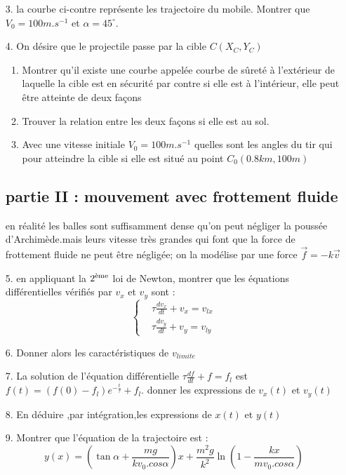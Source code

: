 \documentclass[12pt,a4paper]{article}
\begin{document}
\begin{enumerate}
 \item[3.] la courbe ci-contre représente les trajectoire du mobile. Montrer que $ V_0=100m.s^{-1}$ et  $\alpha = 45^\circ$. 
 \item[4.] On désire que le projectile passe par la cible $C(X_C,Y_C)$
 \begin{enumerate}
 \item Montrer qu'il existe une courbe appelée courbe de sûreté à l'extérieur de laquelle la cible est en sécurité par contre si elle est à l'intérieur, elle peut être atteinte de deux façons 
 \item Trouver la relation entre les deux façons si elle est au sol.
\item Avec une vitesse initiale $V_0=100m.s^{-1}$ quelles sont les angles du tir qui pour atteindre la cible si elle est situé au point $ C_0(0.8 km,100 m)$
 \end{enumerate}
 \subsection*{partie II : mouvement avec frottement fluide }
 en réalité les balles sont suffisamment dense qu'on peut négliger la poussée d'Archimède.mais leurs vitesse très grandes qui font que la force de frottement fluide ne peut être négligée; on la modélise par une force $\vec{f}=-k\vec{v}$
  \item[5.] en appliquant  la $2\textsuperscript{ème}$ loi de Newton, montrer que les équations différentielles vérifiés par $v_x$ et $v_y$ sont : 
\begin{equation*}
\left\{
\begin{aligned}
&\tau\frac{dv_x}{dt}+v_x=v_{lx}\\
& \tau\frac{dv_y}{dt}+v_y=v_{ly}
\end{aligned}
\right.
\end{equation*}
\item[6.] Donner alors les caractéristiques de $v_{limite}$
\item[7.] La solution de l'équation différentielle
 $\tau\frac{df}{dt}+f=f_l$ est $f(t)=(f(0)-f_l)e^{-\frac{t}{\tau}}+f_l$. 
donner les expressions de  $v_x(t)$ et $v_y(t)$ 
\item[8.]En déduire ,par intégration,les expressions de $x(t)$ et $y(t)$ 
\item[9.]Montrer que l'équation de la trajectoire est :$$y(x)=(\tan \alpha+\frac{mg}{kv_0 .cos\alpha})x + \frac{m^2g}{k^2}\ln (1-\frac{kx}{mv_0 .cos\alpha})$$

\end{enumerate}
 
\end{document}
